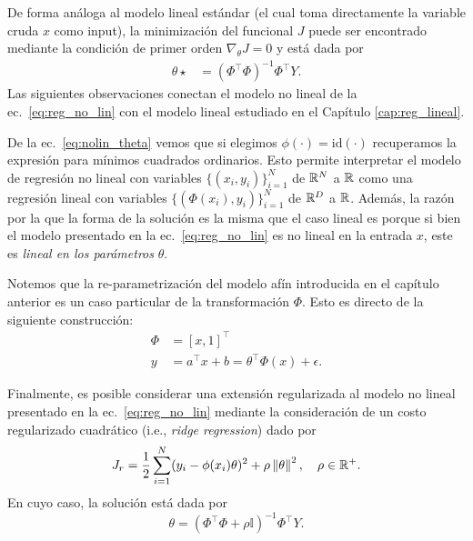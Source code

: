 De forma análoga al modelo lineal estándar (el cual toma directamente la variable cruda $x$ como input), la minimización del funcional $J$ puede  ser encontrado mediante la condición de primer orden $\nabla_\theta J=0$ y está dada por 
\begin{align}
    \theta{\star}&= (\Phi^\top\Phi)^{-1}\Phi^\top Y\label{eq:nolin_theta}.
\end{align}
Las siguientes observaciones conectan el modelo no lineal de la ec.~\eqref{eq:reg_no_lin} con el modelo lineal estudiado en el Capítulo \ref{cap:reg_lineal}.


\begin{remark}
De la ec.~\eqref{eq:nolin_theta} vemos que si elegimos $\phi(\cdot) = \text{id}(\cdot)$ recuperamos la expresión para mínimos cuadrados ordinarios. Esto permite interpretar el modelo de regresión no lineal con variables $\{(x_i,y_i)\}_{i=1}^N$ de ${\mathbb R}^N$ a ${\mathbb R}$ como una regresión lineal con variables $\{(\Phi(x_i),y_i)\}_{i=1}^N$ de ${\mathbb R}^D$ a ${\mathbb R}$. Además, la razón por la que la forma de la solución es la misma que el caso lineal es porque si bien el modelo presentado en la ec.~\eqref{eq:reg_no_lin} es no  lineal en la entrada $x$, este es \emph{lineal en los parámetros} $\theta$.
\end{remark}

\begin{remark}
Notemos que la re-parametrización del modelo afín introducida en el capítulo anterior es un caso particular de la transformación $\Phi$. Esto es directo de la siguiente construcción:
\begin{align*}
    \Phi &= [x, 1]^\top\\
    y &= a^\top x + b  =  \theta^\top\Phi(x)+ \epsilon.
\end{align*}
\end{remark}


\begin{remark}
    Finalmente, es posible considerar una extensión regularizada al modelo no lineal presentado en la   ec.~\eqref{eq:reg_no_lin} mediante la consideración de un costo regularizado cuadrático (i.e., \emph{ridge regression}) dado por 
\begin{equation}
    J_r = \frac{1}{2} \sum_{i=1}^N(y_i - \phi(x_i)\theta)^2 + \rho\left \| \theta \right \|^2,\quad \rho\in{\mathbb R}^+.
\end{equation}
En cuyo caso, la solución está dada por
\begin{equation}
    \theta = (\Phi^\top\Phi+\rho\mathbb{I})^{-1}\Phi^\top Y.
\end{equation}
\end{remark}


